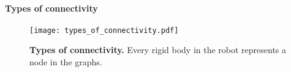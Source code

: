 \paragraph{Types of connectivity}

\begin{figure*}[!h]
	\centering	
	\hspace*{\fill}
	\texttt{[image: types\_of\_connectivity.pdf]}
	\hspace*{\fill}	
	\caption[] {\label{fig:types_of_connectivity}\textbf{Types of connectivity.} Every rigid body in the robot represents a node in the graphs.}
\end{figure*}

